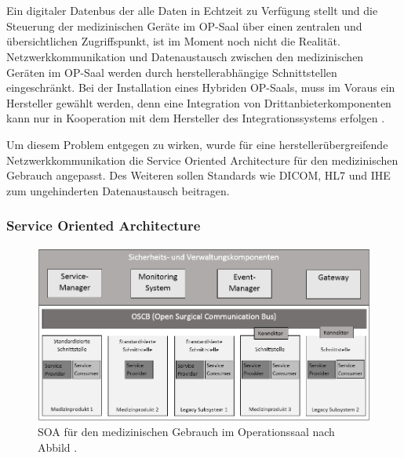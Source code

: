 \chapter{}
\label{sec:overview}

Ein digitaler Datenbus der alle Daten in Echtzeit zu Verfügung stellt und die Steuerung der medizinischen Geräte im OP-Saal über einen zentralen und übersichtlichen Zugriffspunkt, ist im Moment noch nicht die Realität. Netzwerkkommunikation und Datenaustausch zwischen den medizinischen Geräten im OP-Saal werden durch herstellerabhängige Schnittstellen eingeschränkt. Bei der Installation eines Hybriden OP-Saals, muss im Voraus ein Hersteller gewählt werden, denn \glqq eine Integration von Drittanbieterkomponenten kann nur in Kooperation mit dem Hersteller des Integrationssystems erfolgen\grqq{} \cite{DerDigitaleOperationssaal}.

Um diesem Problem entgegen zu wirken, wurde für eine herstellerübergreifende Netzwerkkommunikation die Service Oriented Architecture für den medizinischen Gebrauch angepasst. Des Weiteren sollen Standards wie DICOM, HL7 und IHE zum ungehinderten Datenaustausch beitragen.

\subsection{Service Oriented Architecture}

\begin{figure} [H]
	\includegraphics[scale = 0.6]{Content/Pictures/soa-red.png}
	\caption{SOA für den medizinischen Gebrauch im Operationssaal nach Abbild \cite{DerDigitaleOperationssaal}.}
	\label{fig:soa}
\end{figure}

